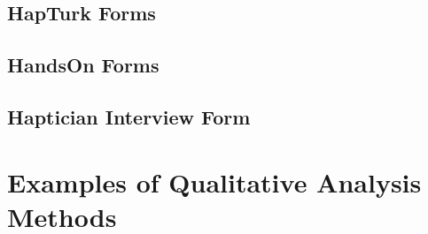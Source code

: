 	
	\subsection{HapTurk Forms}
	\label{ch:SupportingMaterials:ConsentForms:HapTurk}
	
	
	
	
	

	\subsection{HandsOn Forms}
	\label{ch:SupportingMaterials:ConsentForms:HandsOn}
	
	
	
	



	\subsection{Haptician Interview Form}
	\label{ch:SupportingMaterials:ConsentForms:Haptician}
	


\section{Examples of Qualitative Analysis Methods}
\label{ch:SupportingMaterials:MethodExamples}

